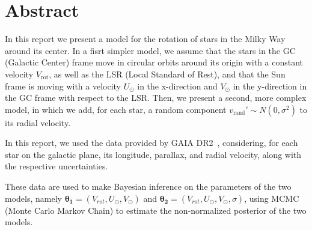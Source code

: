 \section*{Abstract}

In this report we present a model for the rotation of stars in the Milky Way around its center.
In a fisrt simpler model, we assume that the stars in the GC (Galactic Center) frame move in circular orbits around its origin with a constant velocity $V_{\text{rot}}$, as well as the LSR (Local Standard of Rest), and that the Sun frame is moving with a velocity $U_{\odot}$ in the x-direction and $V_{\odot}$ in the y-direction in the GC frame with respect to the LSR. Then, we present a second, more complex model, in which we add, for each star, a random component $v_{\text{rand}}' \sim N(0, \sigma^2)$ to its radial velocity.



In this report, we used the data provided by GAIA DR2~\cite{GAIADR2}, considering, for each star on the galactic plane, its longitude, parallax, and radial velocity, along with the respective uncertainties.

These data are used to make Bayesian inference on the parameters of the two models, namely $\mathbf{\theta_1} = (V_{rot}, U_{\odot}, V_{\odot})$ and $\mathbf{\theta_2} = (V_{rot}, U_{\odot}, V_{\odot}, \sigma)$, using MCMC (Monte Carlo Markov Chain) to estimate the non-normalized posterior of the two models. 



